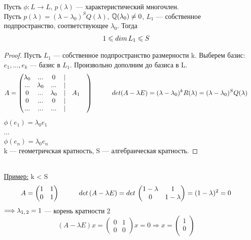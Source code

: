 \begin{theorem}
    Пусть $\phi: L \longrightarrow L$, $p(\lambda)$ --- характеристический многочлен.\\
    Пусть $p(\lambda) = (\lambda - \lambda_0)^S Q(\lambda)$, $\Q(\lambda_0) \neq 0$, $L_1$ --- собственное подпространство, соответствующее $\lambda_0$. Тогда
    \[
    1 \leq dim\thinspace L_1 \leq S
    \]
\end{theorem}
\begin{proof}
    Пусть $L_1$ --- собственное подпространство размерности k. Выберем базис: $e_1, ..., e_k$ --- базис в $L_1$. Произвольно дополним до базиса в L.
    \[
    A = \begin{pmatrix}
        \lambda_0 & ... & 0 & | & &\\
        ... & \lambda_0 & ... & | & &\\
        0 & ... &\lambda_0 & | & A_1 &\\
        0 & ... & 0 & | & &\\
        ... & ... & ... & | & &\\
    \end{pmatrix}\tab det(A - \lambda E) = (\lambda - \lambda_0)^kR(\lambda) = (\lambda - \lambda_0)^SQ(\lambda)
    \]
    $\phi(e_1) = \lambda_0e_1$\\
    ...\\
    $\phi(e_n) = \lambda_0e_n$\\
    k --- геометричская кратность, S --- алгебраическая кратность.
\end{proof}

\tab\\

\underline{Пример:} k < S\\

\[
A = \begin{pmatrix}
    1 & 1\\
    0 & 1\\
\end{pmatrix} \tab det\thinspace (A - \lambda E) = det\thinspace\begin{pmatrix}
    1 - \lambda & 1\\
    0 & 1 - \lambda\\
\end{pmatrix} = (1 - \lambda)^2 = 0
\]
$\Longrightarrow \lambda_{1,\thinspace 2} = 1$ --- корень кратности 2
\[
(A - \lambda E)x = \begin{pmatrix}
    0 & 1\\
    0 & 0
\end{pmatrix}x = 0 \Longrightarrow x = \begin{pmatrix}
    1\\
    0\\
\end{pmatrix}
\]

